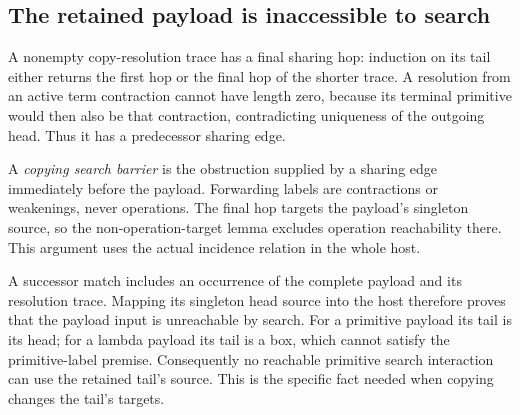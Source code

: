 




\subsection{The retained payload is inaccessible to search}

A nonempty copy-resolution trace has a final sharing hop: induction on its
tail either returns the first hop or the final hop of the shorter trace. A
resolution from an active term contraction cannot have length zero, because
its terminal primitive would then also be that contraction, contradicting
uniqueness of the outgoing head. Thus it has a predecessor sharing edge.



A \emph{copying search barrier} is the obstruction supplied by a sharing edge
immediately before the payload. Forwarding labels are contractions or
weakenings, never operations. The final hop targets the payload's singleton
source, so the non-operation-target lemma excludes operation reachability
there. This argument uses the actual incidence relation in the whole host.



A successor match includes an occurrence of the complete payload and its
resolution trace. Mapping its singleton head source into the host therefore
proves that the payload input is unreachable by search. For a primitive
payload its tail is its head; for a lambda payload its tail is a box, which
cannot satisfy the primitive-label premise. Consequently no reachable
primitive search interaction can use the retained tail's source. This is the
specific fact needed when copying changes the tail's targets.

